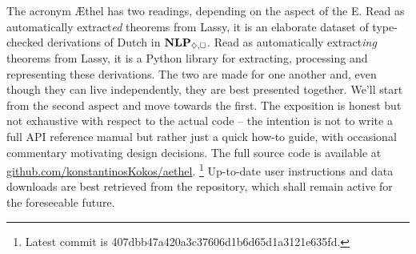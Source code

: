 
\section{\todo}
\label{appendix:aethel}

The acronym \AE thel has two readings, depending on the aspect of the E.
Read as automatically extract\textit{ed} theorems from Lassy, it is an elaborate dataset of type-checked derivations of Dutch in $\NLPplus{}$.
Read as automatically extract\textit{ing} theorems from Lassy, it is a Python library for extracting, processing and representing these derivations.
The two are made for one another and, even though they can live independently, they are best presented together.
We'll start from the second aspect and move towards the first.
The exposition is honest but not exhaustive with respect to the actual code -- the intention is not to write a full API reference manual but rather just a quick how-to guide, with occasional commentary motivating design decisions.
The full source code is available at \href{https://github.com/konstantinosKokos/aethel}{github.com/konstantinosKokos/aethel}.%
	\footnote{Latest commit is 407dbb47a420a3c37606d1b6d65d1a3121e635fd.}
Up-to-date user instructions and data downloads are best retrieved from the repository, which shall remain active for the foreseeable future.

